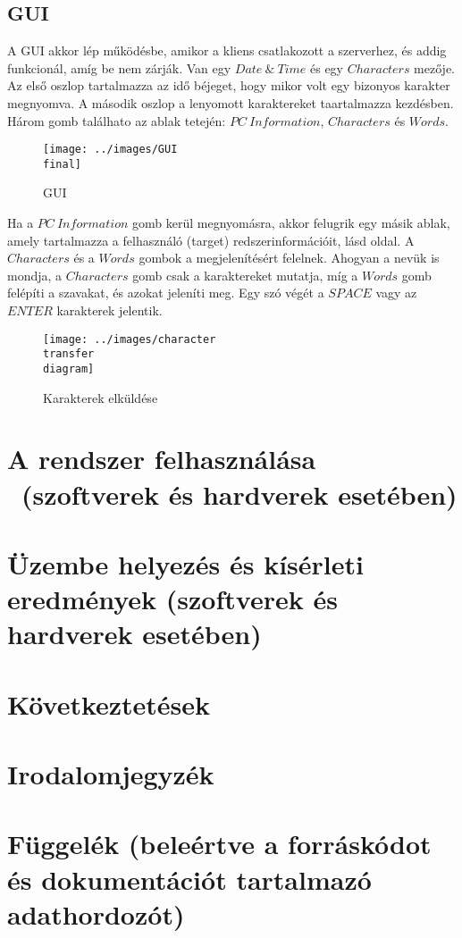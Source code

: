 \documentclass[a4paper, 11pt]{article}
\begin{document}
\subsection{GUI}\label{subsec:gui}
A GUI akkor lép működésbe, amikor a kliens csatlakozott a szerverhez, és addig funkcionál, amíg be nem zárják. Van egy $Date\ \&\ Time$ és egy $Characters$ mezője. Az első oszlop tartalmazza az idő béjeget, hogy mikor volt egy bizonyos karakter megnyomva. A második oszlop a lenyomott karaktereket taartalmazza kezdésben. Három gomb találhato az ablak tetején: $PC\ Information$, $Characters$ és $Words$.
\begin{figure}[H]
\centering
\texttt{[image: ../images/GUI\\ final]}
\caption{GUI}
\label{fig:gui}
\end{figure}
Ha a $PC\ Information$ gomb kerül megnyomásra, akkor felugrik egy másik ablak, amely tartalmazza a felhasználó (target) redszerinformációit, lásd \pageref{subsubsec:keyloggerclientclass} oldal. A $Characters$ és a $Words$ gombok a megjelenítésért felelnek. Ahogyan a nevük is mondja, a $Characters$ gomb csak a karaktereket mutatja, míg a $Words$ gomb felépíti a szavakat, és azokat jeleníti meg. Egy szó végét a $SPACE$ vagy az $ENTER$ karakterek jelentik.

\begin{figure}[H]
\centering
\texttt{[image: ../images/character\\ transfer\\ diagram]}
\caption{Karakterek elküldése}
\label{fig:chartransferdia}
\end{figure}

\section{A rendszer felhasználása \ (szoftverek és hardverek esetében)}\label{sec:useage}

\section{Üzembe helyezés és kísérleti eredmények (szoftverek és hardverek esetében)}\label{sec:testcases}

\section{Következtetések}\label{sec:conc}

\section{Irodalomjegyzék}\label{sec:irod}
%
\printbibliography[title={\ }]

\section{Függelék (beleértve a forráskódot és dokumentációt tartalmazó adathordozót)}\label{sec:dep}
\end{document}
